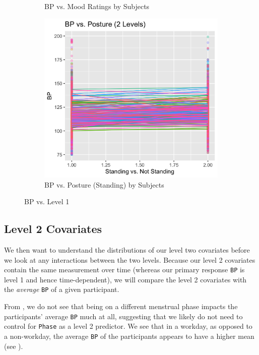 \documentclass[12pt,twoside,letterpaper]{article}
\theoremstyle{definition}
\theoremstyle{definition}
\begin{document}
\begin{figure}
\begin{subfigure}[b]{0.32\textwidth}
    \caption[]%
    {{\small BP vs. Mood Ratings by Subjects}}
    \label{fig: bp v mood}
    \end{subfigure}
    \hfill
    \begin{subfigure}[b]{0.32\textwidth}
    \centering
    \includegraphics[width=\textwidth]{pics/bp v stand.png}
    \caption[]%
    {{\small BP vs. Posture (Standing) by Subjects}}
    \label{fig: bp v stand}
    \end{subfigure}
    \caption[]
    {\small BP vs. Level 1}
    \label{fig: bp v level1}
    \end{figure}

\subsection{Level 2 Covariates}\label{sec: lv2}

We then want to understand the distributions of our level two covariates before we look at any interactions between the two levels. Because our level 2 covariates contain the same measurement over time (whereas our primary response \texttt{BP} is level 1 and hence time-dependent), we will compare the level 2 covariates with the \emph{average} \texttt{BP} of a given participant. 

From , we do not see that being on a different menstrual phase impacts the participants' average \texttt{BP} much at all, suggesting that we likely do not need to control for \texttt{Phase} as a level 2 predictor. We see that in a workday, as opposed to a non-workday, the average \texttt{BP} of the participants appears to have a higher mean (see ). 
\end{document}
